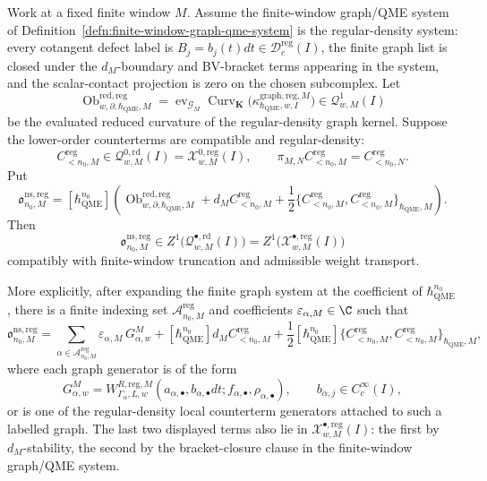 \begin{prop}
\label{prop:wt-regular-density-curvature-criterion}
  Work at a fixed finite window \(M\).  Assume the finite-window
  graph/QME system of
  Definition~\ref{defn:finite-window-graph-qme-system} is the
  regular-density system: every cotangent defect label is
  \(B_j=b_j(t)dt\in\mathcal D^{\mathrm{reg}}_c(I)\), the finite graph list
  is closed under the \(d_M\)-boundary and BV-bracket terms appearing in
  the system, and the scalar-contact projection is zero on the chosen
  subcomplex.  Let
  \[
    \operatorname{Ob}^{\mathrm{red,reg}}_{w,\partial,\hbar_{\mathrm{QME}},M}
      =
    \operatorname{ev}_{\mathcal G_M}
      \operatorname{Curv}_{\mathbf K}
      \bigl(\kappa^{\mathrm{graph,reg},M}_{\hbar_{\mathrm{QME}},w,I}\bigr)
      \in
    \mathcal Q^1_{w,M}(I)
  \]
  be the evaluated reduced curvature of the regular-density graph kernel.
  Suppose the lower-order counterterms are compatible and regular-density:
  \[
    C^{\mathrm{reg}}_{<n_0,M}
      \in
    \mathcal Q^{0,\mathrm{rd}}_{w,M}(I)
      =
    \mathcal X^{0,\mathrm{reg}}_{w,M}(I),
    \qquad
    \pi_{M,N}C^{\mathrm{reg}}_{<n_0,M}
      =
    C^{\mathrm{reg}}_{<n_0,N}.
  \]
  Put
  \[
    \mathfrak o^{\mathrm{ns,reg}}_{n_0,M}
      =
      [\hbar_{\mathrm{QME}}^{n_0}]\left(
        \operatorname{Ob}^{\mathrm{red,reg}}_{w,\partial,\hbar_{\mathrm{QME}},M}
        +d_MC^{\mathrm{reg}}_{<n_0,M}
        +\frac12
          \{C^{\mathrm{reg}}_{<n_0,M},
            C^{\mathrm{reg}}_{<n_0,M}\}_{\hbar_{\mathrm{QME}},M}
      \right).
  \]
  Then
  \[
    \mathfrak o^{\mathrm{ns,reg}}_{n_0,M}
      \in
    Z^1\bigl(\mathcal Q^{\bullet,\mathrm{rd}}_{w,M}(I)\bigr)
      =
    Z^1\bigl(\mathcal X^{\bullet,\mathrm{reg}}_{w,M}(I)\bigr)
  \]
  compatibly with finite-window truncation and admissible weight transport.

  More explicitly, after expanding the finite graph system at the
  coefficient of \(\hbar_{\mathrm{QME}}^{n_0}\), there is a finite indexing set
  \(\mathcal A^{\mathrm{reg}}_{n_0,M}\) and coefficients
  \(\varepsilon_{\alpha,M}\in\C\) such that
  \[
    \mathfrak o^{\mathrm{ns,reg}}_{n_0,M}
      =
    \sum_{\alpha\in\mathcal A^{\mathrm{reg}}_{n_0,M}}
      \varepsilon_{\alpha,M}\,G^M_{\alpha,w}
      +[\hbar_{\mathrm{QME}}^{n_0}]d_MC^{\mathrm{reg}}_{<n_0,M}
      +\frac12[\hbar_{\mathrm{QME}}^{n_0}]
        \{C^{\mathrm{reg}}_{<n_0,M},
          C^{\mathrm{reg}}_{<n_0,M}\}_{\hbar_{\mathrm{QME}},M},
  \]
  where each graph generator is of the form
  \[
    G^M_{\alpha,w}
      =
    W^{R,\mathrm{reg},M}_{\Gamma_\alpha,L,w}
      (a_{\alpha,\bullet},b_{\alpha,\bullet}dt;
       f_{\alpha,\bullet},\rho_{\alpha,\bullet}),
    \qquad
    b_{\alpha,j}\in C^\infty_c(I),
  \]
  or is one of the regular-density local counterterm generators attached
  to such a labelled graph.  The last two displayed terms also lie in
  \(\mathcal X^{\bullet,\mathrm{reg}}_{w,M}(I)\): the first by
  \(d_M\)-stability, the second by the bracket-closure clause in the
  finite-window graph/QME system.


\end{prop}
